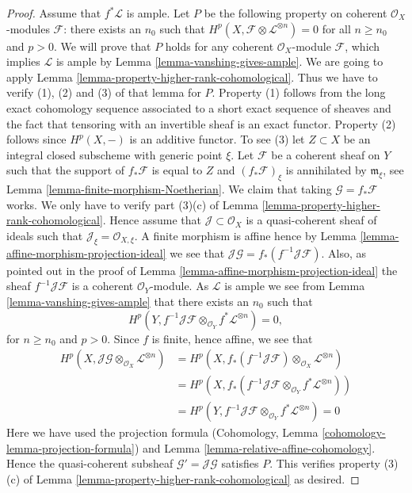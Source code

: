 \documentclass{stacks-project}
\theoremstyle{plain}
\theoremstyle{definition}
\theoremstyle{remark}
\numberwithin{equation}{subsection}
\begin{document}
\begin{proof}
\medskip\noindent
Assume that $f^*\mathcal{L}$ is ample. Let $P$ be the following property on
coherent $\mathcal{O}_X$-modules $\mathcal{F}$: there exists an $n_0$
such that $H^p(X, \mathcal{F} \otimes \mathcal{L}^{\otimes n}) = 0$
for all $n \geq n_0$ and $p > 0$. We will prove that $P$ holds
for any coherent $\mathcal{O}_X$-module $\mathcal{F}$, which implies
$\mathcal{L}$ is ample by Lemma \ref{lemma-vanshing-gives-ample}.
We are going to apply Lemma \ref{lemma-property-higher-rank-cohomological}.
Thus we have to verify (1), (2) and (3) of that lemma for $P$.
Property (1) follows from the long exact cohomology sequence associated
to a short exact sequence of sheaves and the fact that tensoring with
an invertible sheaf is an exact functor. Property (2) follows since
$H^p(X, -)$ is an additive functor. To see (3) let $Z \subset X$ be
an integral closed subscheme with generic point $\xi$.
Let $\mathcal{F}$ be a coherent sheaf on $Y$ such that
the support of $f_*\mathcal{F}$ is equal to $Z$
and $(f_*\mathcal{F})_\xi$ is annihilated by $\mathfrak m_\xi$,
see Lemma \ref{lemma-finite-morphism-Noetherian}. We claim that
taking $\mathcal{G} = f_*\mathcal{F}$ works. We only have to verify
part (3)(c) of Lemma \ref{lemma-property-higher-rank-cohomological}.
Hence assume that $\mathcal{J} \subset \mathcal{O}_X$ is a
quasi-coherent sheaf of ideals such that
$\mathcal{J}_\xi = \mathcal{O}_{X, \xi}$.
A finite morphism is affine hence by
Lemma \ref{lemma-affine-morphism-projection-ideal} we see that
$\mathcal{J}\mathcal{G} = f_*(f^{-1}\mathcal{J}\mathcal{F})$.
Also, as pointed out in the proof of
Lemma \ref{lemma-affine-morphism-projection-ideal} the sheaf
$f^{-1}\mathcal{J}\mathcal{F}$ is a coherent $\mathcal{O}_Y$-module.
As $\mathcal{L}$ is ample we see from Lemma \ref{lemma-vanshing-gives-ample}
that there exists an $n_0$ such that
$$
H^p(Y, f^{-1}\mathcal{J}\mathcal{F}
\otimes_{\mathcal{O}_Y} f^*\mathcal{L}^{\otimes n}) = 0,
$$
for $n \geq n_0$ and $p > 0$. Since $f$ is finite, hence affine, we see that
\begin{align*}
H^p(X, \mathcal{J}\mathcal{G} \otimes_{\mathcal{O}_X}
\mathcal{L}^{\otimes n})
& =
H^p(X, f_*(f^{-1}\mathcal{J}\mathcal{F}) \otimes_{\mathcal{O}_X}
\mathcal{L}^{\otimes n}) \\
& =
H^p(X, f_*(f^{-1}\mathcal{J}\mathcal{F} \otimes_{\mathcal{O}_Y}
f^*\mathcal{L}^{\otimes n})) \\
& =
H^p(Y, f^{-1}\mathcal{J}\mathcal{F} \otimes_{\mathcal{O}_Y}
f^*\mathcal{L}^{\otimes n}) = 0
\end{align*}
Here we have used the projection formula
(Cohomology, Lemma \ref{cohomology-lemma-projection-formula}) and
Lemma \ref{lemma-relative-affine-cohomology}.
Hence the quasi-coherent subsheaf $\mathcal{G}' = \mathcal{J}\mathcal{G}$
satisfies $P$. This verifies property (3)(c) of
Lemma \ref{lemma-property-higher-rank-cohomological} as desired.
\end{proof}
\end{document}
